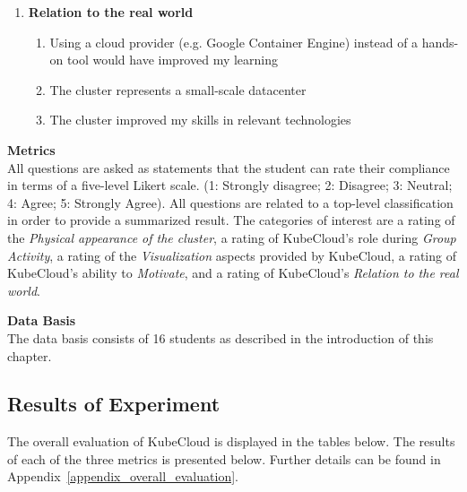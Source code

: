 \begin{enumerate}
	\item\textbf{Relation to the real world}
	\vspace{-4mm}
	\begin{enumerate}
	    \setlength\itemsep{0.05em}
		\item Using a cloud provider (e.g. Google Container Engine) instead of a hands-on tool would have improved my learning
		\item The cluster represents a small-scale datacenter
		\item The cluster improved my skills in relevant technologies
	\end{enumerate}
	 
\end{enumerate}

\noindent\textbf{Metrics} \\
All questions are asked as statements that the student can rate their compliance in terms of a five-level Likert scale. (1: Strongly disagree; 2: Disagree; 3: Neutral; 4: Agree; 5: Strongly Agree). All questions are related to a top-level classification in order to provide a summarized result. The categories of interest are a rating of the \textit{Physical appearance of the cluster}, a rating of KubeCloud's role during \textit{Group Activity}, a rating of the \textit{Visualization} aspects provided by KubeCloud, a rating of KubeCloud's ability to \textit{Motivate}, and a rating of KubeCloud's \textit{Relation to the real world}. \\
\noindent 


\noindent\textbf{Data Basis}\\
The data basis consists of 16 students as described in the introduction of this chapter.


\subsection*{Results of Experiment}
The overall evaluation of KubeCloud is displayed in the tables below. The results of each of the three metrics is presented below. Further details can be found in Appendix~\ref{appendix_overall_evaluation}.




